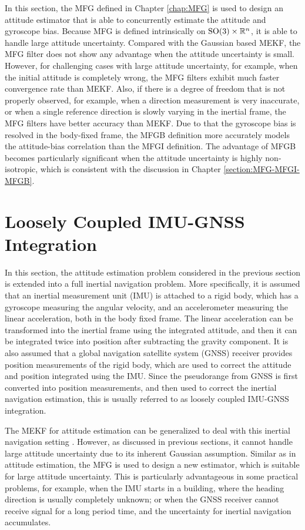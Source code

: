 In this section, the MFG defined in Chapter \ref{chap:MFG} is used to design an attitude estimator that is able to concurrently estimate the attitude and gyroscope bias.
Because MFG is defined intrinsically on $\mathrm{SO}(3)\times \mathbb{R}^n$, it is able to handle large attitude uncertainty.
Compared with the Gaussian based MEKF, the MFG filter does not show any advantage when the attitude uncertainty is small.
However, for challenging cases with large attitude uncertainty, for example, when the initial attitude is completely wrong, the MFG filters exhibit much faster convergence rate than MEKF.
Also, if there is a degree of freedom that is not properly observed, for example, when a direction measurement is very inaccurate, or when a single reference direction is slowly varying in the inertial frame, the MFG filters have better accuracy than MEKF.
Due to that the gyroscope bias is resolved in the body-fixed frame, the MFGB definition more accurately models the attitude-bias correlation than the MFGI definition.
The advantage of MFGB becomes particularly significant when the attitude uncertainty is highly non-isotropic, which is consistent with the discussion in Chapter \ref{section:MFG-MFGI-MFGB}.

\section{Loosely Coupled IMU-GNSS Integration} \label{section:posEst}

In this section, the attitude estimation problem considered in the previous section is extended into a full inertial navigation problem.
More specifically, it is assumed that an inertial measurement unit (IMU) is attached to a rigid body, which has a gyroscope measuring the angular velocity, and an accelerometer measuring the linear acceleration, both in the body fixed frame.
The linear acceleration can be transformed into the inertial frame using the integrated attitude, and then it can be integrated twice into position after subtracting the gravity component.
It is also assumed that a global navigation satellite system (GNSS) receiver provides position measurements of the rigid body, which are used to correct the attitude and position integrated using the IMU.
Since the pseudorange from GNSS is first converted into position measurements, and then used to correct the inertial navigation estimation, this is usually referred to as loosely coupled IMU-GNSS integration.

The MEKF for attitude estimation can be generalized to deal with this inertial navigation setting \cite{sola2017quaternion}.
However, as discussed in previous sections, it cannot handle large attitude uncertainty due to its inherent Gaussian assumption.
Similar as in attitude estimation, the MFG is used to design a new estimator, which is suitable for large attitude uncertainty.
This is particularly advantageous in some practical problems, for example, when the IMU starts in a building, where the heading direction is usually completely unknown; or when the GNSS receiver cannot receive signal for a long period time, and the uncertainty for inertial navigation accumulates.

